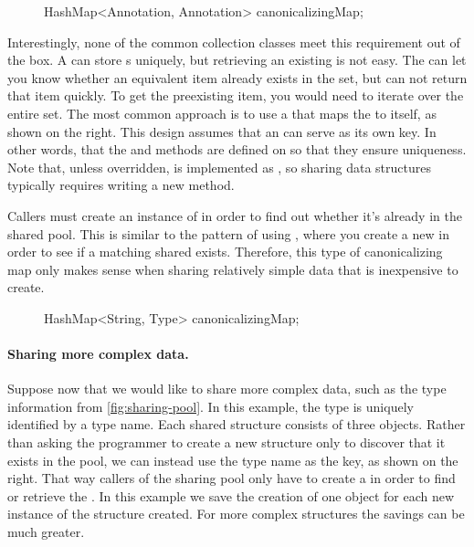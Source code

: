 \begin{figure}
\centering
\begin{framedlisting}
HashMap<Annotation, Annotation> canonicalizingMap;
\end{framedlisting}
\end{figure}

Interestingly, none of the common collection classes meet this requirement
out of the box. A  can store s uniquely, but
retrieving an existing  is not easy. The 
can let you know whether an equivalent item already
exists in the set, but can not return that item quickly. To get the
preexisting item, you would need to iterate over the entire set. The
most common approach is to use a
 that maps the  to itself, as shown on the
right. This design assumes that an  can serve as its own key.
In other words, that the  and  methods are
defined on  so that they ensure uniqueness. Note that, unless overridden,  is
implemented as \code{==}, so sharing data structures typically requires writing
a new  method.  

Callers must create an instance of  in order
to find out whether it's already in the shared pool. This
is similar to the pattern of using , where you create a new
 in order to see if a matching shared  exists. Therefore, this type
of canonicalizing map only makes sense when sharing relatively simple data
that is inexpensive to create.

\begin{figure}
\centering
\begin{framedlisting}
HashMap<String, Type> canonicalizingMap;
\end{framedlisting}
\end{figure}

\paragraph{Sharing more complex data.} Suppose now that we would like to
share more complex data, such as the type information from \autoref{fig:sharing-pool}. In this example, the type is
uniquely identified by a  type name. Each shared structure
consists of three objects. Rather than asking the programmer to create a new  structure only to discover
that it exists in the pool, we can instead use the type name as the key, as
shown on the right. That way callers of the sharing pool only have to create a
 in order to find or retrieve the . In this example we save the creation of
one object for each new instance of the structure created.  For more complex
structures the savings can be much greater.


